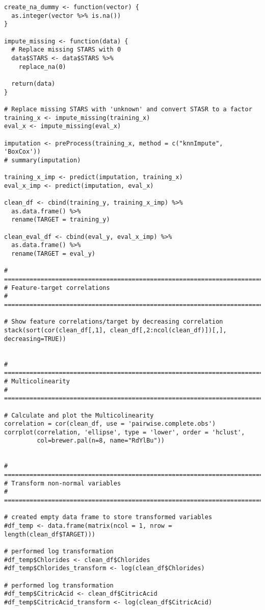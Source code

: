 \documentclass[
]{article}
\begin{document}
\begin{verbatim}
create_na_dummy <- function(vector) {
  as.integer(vector %>% is.na())
}

impute_missing <- function(data) {
  # Replace missing STARS with 0 
  data$STARS <- data$STARS %>%
    replace_na(0)

  return(data)
}

# Replace missing STARS with 'unknown' and convert STASR to a factor
training_x <- impute_missing(training_x)
eval_x <- impute_missing(eval_x)

imputation <- preProcess(training_x, method = c("knnImpute", 'BoxCox'))
# summary(imputation)

training_x_imp <- predict(imputation, training_x)
eval_x_imp <- predict(imputation, eval_x)

clean_df <- cbind(training_y, training_x_imp) %>% 
  as.data.frame() %>%
  rename(TARGET = training_y)

clean_eval_df <- cbind(eval_y, eval_x_imp) %>% 
  as.data.frame() %>%
  rename(TARGET = eval_y)
  
# =====================================================================================
# Feature-target correlations
# =====================================================================================
  
# Show feature correlations/target by decreasing correlation
stack(sort(cor(clean_df[,1], clean_df[,2:ncol(clean_df)])[,], decreasing=TRUE))


# =====================================================================================
# Multicolinearity
# =====================================================================================

# Calculate and plot the Multicolinearity
correlation = cor(clean_df, use = 'pairwise.complete.obs')
corrplot(correlation, 'ellipse', type = 'lower', order = 'hclust',
         col=brewer.pal(n=8, name="RdYlBu"))
         

# =====================================================================================
# Transform non-normal variables
# =====================================================================================

# created empty data frame to store transformed variables
#df_temp <- data.frame(matrix(ncol = 1, nrow = length(clean_df$TARGET)))

# performed log transformation
#df_temp$Chlorides <- clean_df$Chlorides
#df_temp$Chlorides_transform <- log(clean_df$Chlorides)

# performed log transformation
#df_temp$CitricAcid <- clean_df$CitricAcid
#df_temp$CitricAcid_transform <- log(clean_df$CitricAcid)


\end{verbatim}
\end{document}
